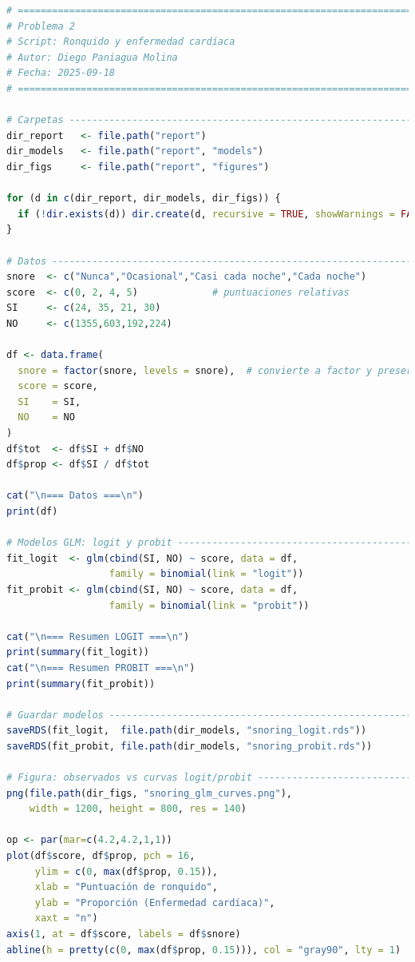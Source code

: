 \begin{lstlisting}[language=R, caption={Script: Ronquido y enfermedad cardiaca}, label={lst:script1}]
# =============================================================================
# Problema 2 
# Script: Ronquido y enfermedad cardíaca
# Autor: Diego Paniagua Molina
# Fecha: 2025-09-18
# =============================================================================

# Carpetas --------------------------------------------------------------------
dir_report   <- file.path("report")
dir_models   <- file.path("report", "models")
dir_figs     <- file.path("report", "figures")

for (d in c(dir_report, dir_models, dir_figs)) {
  if (!dir.exists(d)) dir.create(d, recursive = TRUE, showWarnings = FALSE)
}

# Datos -----------------------------------------------------------------------
snore  <- c("Nunca","Ocasional","Casi cada noche","Cada noche")
score  <- c(0, 2, 4, 5)             # puntuaciones relativas
SI     <- c(24, 35, 21, 30)
NO     <- c(1355,603,192,224)

df <- data.frame(
  snore = factor(snore, levels = snore),  # convierte a factor y preserva orden
  score = score,
  SI    = SI,
  NO    = NO
)
df$tot  <- df$SI + df$NO
df$prop <- df$SI / df$tot

cat("\n=== Datos ===\n")
print(df)

# Modelos GLM: logit y probit -------------------------------------------------
fit_logit  <- glm(cbind(SI, NO) ~ score, data = df,
                  family = binomial(link = "logit"))
fit_probit <- glm(cbind(SI, NO) ~ score, data = df,
                  family = binomial(link = "probit"))

cat("\n=== Resumen LOGIT ===\n")
print(summary(fit_logit))
cat("\n=== Resumen PROBIT ===\n")
print(summary(fit_probit))

# Guardar modelos -------------------------------------------------------------
saveRDS(fit_logit,  file.path(dir_models, "snoring_logit.rds"))
saveRDS(fit_probit, file.path(dir_models, "snoring_probit.rds"))

# Figura: observados vs curvas logit/probit -----------------------------------
png(file.path(dir_figs, "snoring_glm_curves.png"),
    width = 1200, height = 800, res = 140)

op <- par(mar=c(4.2,4.2,1,1))
plot(df$score, df$prop, pch = 16,
     ylim = c(0, max(df$prop, 0.15)),
     xlab = "Puntuación de ronquido",
     ylab = "Proporción (Enfermedad cardíaca)",
     xaxt = "n")
axis(1, at = df$score, labels = df$snore)
abline(h = pretty(c(0, max(df$prop, 0.15))), col = "gray90", lty = 1)


\end{lstlisting}
